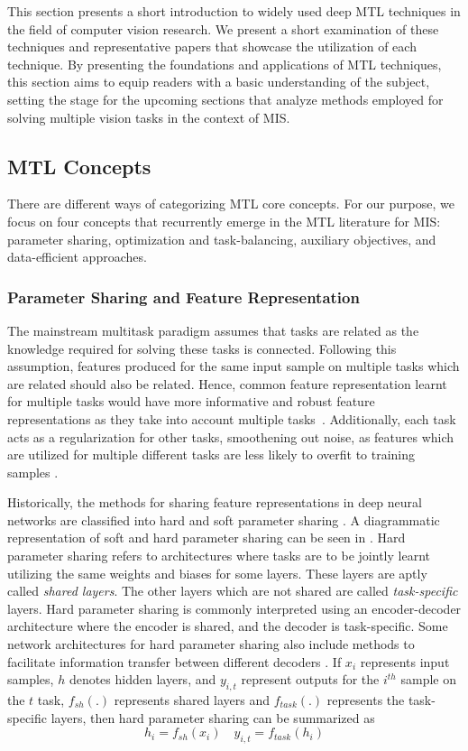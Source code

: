 This section presents a short introduction to widely used deep MTL techniques in the field of computer vision research. We present a short examination of these techniques and representative papers that showcase the utilization of each technique. By presenting the foundations and applications of MTL techniques, this section aims to equip readers with a basic understanding of the subject, setting the stage for the upcoming sections that analyze methods employed for solving multiple vision tasks in the context of MIS.


\subsection{MTL Concepts}
There are different ways of categorizing MTL core concepts. For our purpose, we focus on four concepts that recurrently emerge in the MTL literature for MIS: parameter sharing, optimization and task-balancing, auxiliary objectives, and data-efficient approaches.  


\subsubsection{Parameter Sharing and Feature Representation} \label{subsec::parameter_sharing}
The mainstream multitask paradigm assumes that tasks are related as the knowledge required for solving these tasks is connected. Following this assumption, features produced for the same input sample on multiple tasks which are related should also be related. 
Hence, common feature representation learnt for multiple tasks would have more informative and robust feature representations as they take into account multiple tasks~\citep{survey_zhang}.
Additionally, each task acts as a regularization for other tasks, smoothening out noise, as features which are utilized for multiple different tasks are less likely to overfit to training samples \citep{survey_zhang}. 


Historically, the methods for sharing feature representations in deep neural networks are classified into hard and soft parameter sharing \citep{survey_simon}. A diagrammatic representation of soft and hard parameter sharing can be seen in .
Hard parameter sharing refers to architectures where tasks are to be jointly learnt utilizing the same weights and biases for some layers. These layers are aptly called \emph{shared layers}. The other layers which are not shared are called \emph{task-specific} layers. Hard parameter sharing is commonly interpreted using an encoder-decoder architecture where the encoder is shared, and the decoder is task-specific. Some network architectures for hard parameter sharing also include methods to facilitate information transfer between different decoders \citep{Xu_2018_CVPR,MTAN,Zhang_2018_ECCV}.
If $x_i$ represents input samples, $h$ denotes hidden layers, and $y_{i,t}$ represent outputs for the $i^{th}$ sample on the $t$ task, $f_{sh}(.)$ represents shared layers and $f_{task}(.)$ represents the task-specific layers, then hard parameter sharing can be summarized as  
\begin{equation}
    h_i = f_{sh}(x_{i}) \quad y_{i,t} = f_{task}(h_{i})
\end{equation}
   

